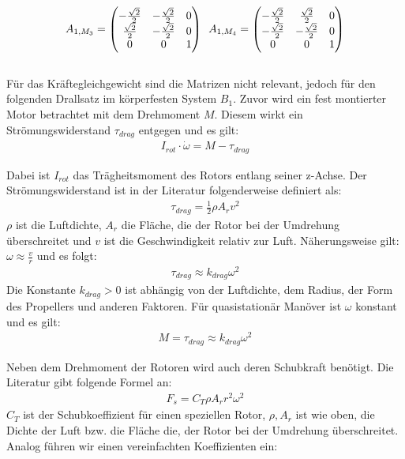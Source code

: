 \[
  A_{1, M_3} = \begin{pmatrix} -\frac{\sqrt{2}}{2} & -\frac{\sqrt{2}}{2} & 0 \\ \frac{\sqrt{2}}{2} & -\frac{\sqrt{2}}{2} & 0 \\ 0 & 0 & 1 \end{pmatrix} \hspace{0.5em}
  A_{1, M_4} = \begin{pmatrix} -\frac{\sqrt{2}}{2} & \frac{\sqrt{2}}{2} & 0 \\ -\frac{\sqrt{2}}{2} & -\frac{\sqrt{2}}{2} & 0 \\ 0 & 0 & 1 \end{pmatrix}
\]
\\
Für das Kräftegleichgewicht sind die Matrizen nicht relevant, jedoch für den folgenden Drallsatz im körperfesten System $B_1$. %
Zuvor wird ein fest montierter Motor betrachtet mit dem Drehmoment $M$. Diesem wirkt ein Strömungswiderstand $\tau_{drag}$ entgegen und es gilt: 
\begin{align}
{I_{rot}} \cdot \dot{\omega}  = M - \tau_{drag} 
\end{align}

Dabei ist $I_{rot}$ das Trägheitsmoment des Rotors entlang seiner z-Achse. Der Strömungswiderstand ist in der Literatur \cite{LQR2013} folgenderweise definiert als:
\begin{align}
    \tau_{drag} = \frac{1}{2} \rho A_r v^2
\end{align}
$\rho$ ist die Luftdichte, $A_r$ die Fläche, die der Rotor bei der Umdrehung überschreitet und $v$ ist die Geschwindigkeit relativ zur Luft. Näherungsweise gilt: $\omega \approx \frac{v}{r}$ und es folgt:
\begin{align}
    \tau_{drag} \approx k_{drag} \omega^2
\end{align}
Die Konstante $k_{drag} > 0$ ist abhängig von der Luftdichte, dem Radius, der Form des Propellers und anderen Faktoren. Für quasistationär Manöver ist $\omega$ konstant und es gilt: 
\begin{align}\label{gl:MDrag}
    M = \tau_{drag} \approx k_{drag} \omega^2 
\end{align}

Neben dem Drehmoment der Rotoren wird auch deren Schubkraft benötigt. Die Literatur \cite{LQR2013} gibt folgende Formel an:
\begin{align}
    F_s = C_T \rho A_r r^2 \omega^2 
\end{align}
$C_T$ ist der Schubkoeffizient für einen speziellen Rotor, $\rho, A_r$ ist wie oben, die Dichte der Luft bzw. die Fläche die, der Rotor bei der Umdrehung überschreitet. Analog führen wir einen vereinfachten Koeffizienten ein:

